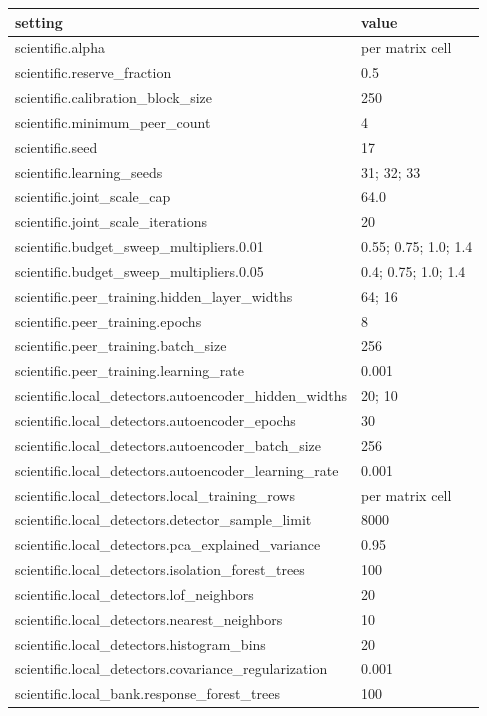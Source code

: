 \begin{tabular}{ll}
\toprule
setting & value \\
\midrule
scientific.alpha & per matrix cell \\
scientific.reserve\_fraction & 0.5 \\
scientific.calibration\_block\_size & 250 \\
scientific.minimum\_peer\_count & 4 \\
scientific.seed & 17 \\
scientific.learning\_seeds & 31; 32; 33 \\
scientific.joint\_scale\_cap & 64.0 \\
scientific.joint\_scale\_iterations & 20 \\
scientific.budget\_sweep\_multipliers.0.01 & 0.55; 0.75; 1.0; 1.4 \\
scientific.budget\_sweep\_multipliers.0.05 & 0.4; 0.75; 1.0; 1.4 \\
scientific.peer\_training.hidden\_layer\_widths & 64; 16 \\
scientific.peer\_training.epochs & 8 \\
scientific.peer\_training.batch\_size & 256 \\
scientific.peer\_training.learning\_rate & 0.001 \\
scientific.local\_detectors.autoencoder\_hidden\_widths & 20; 10 \\
scientific.local\_detectors.autoencoder\_epochs & 30 \\
scientific.local\_detectors.autoencoder\_batch\_size & 256 \\
scientific.local\_detectors.autoencoder\_learning\_rate & 0.001 \\
scientific.local\_detectors.local\_training\_rows & per matrix cell \\
scientific.local\_detectors.detector\_sample\_limit & 8000 \\
scientific.local\_detectors.pca\_explained\_variance & 0.95 \\
scientific.local\_detectors.isolation\_forest\_trees & 100 \\
scientific.local\_detectors.lof\_neighbors & 20 \\
scientific.local\_detectors.nearest\_neighbors & 10 \\
scientific.local\_detectors.histogram\_bins & 20 \\
scientific.local\_detectors.covariance\_regularization & 0.001 \\
scientific.local\_bank.response\_forest\_trees & 100 \\

\end{tabular}
